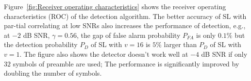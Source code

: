 
Figure~\ref{fig:Receiver operating characteristics} shows the receiver operating characteristics (ROC) of the detection algorithm.
The better accuracy of SL with par-tial correlating at low SNRs also increases the performance of detection, e.g.,
at $-2$ dB SNR, $\gamma=0.56$, the gap of false alarm probability $P_{FA}$ is only $0.1\%$ but the detection probability $P_{D}$ of SL with $v{=}16$ is $5\%$ larger than $P_D$ of SL with $v{=}1$. 
The figure also shows the detector doesn't work well at $-4$ dB SNR if only $32$ symbols of preamble are used;  
The performance is significantly improved by doubling the number of symbols.
